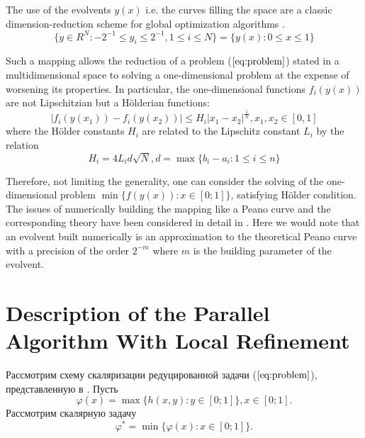 \documentclass{llncs}
\begin{document}
The use of the evolvents \(y(x)\) i.e. the curves filling the space are a classic dimension-reduction scheme for global optimization algorithms \cite{evolvents2013}.
\begin{displaymath}
\label{cube}
\lbrace y\in R^N:-2^{-1}\leqslant y_i\leqslant 2^{-1},1\leqslant i\leqslant N\rbrace=\{y(x):0\leqslant x\leqslant 1\}
\end{displaymath}
\par
Such a mapping allows the reduction of a problem (\(\ref{eq:problem}\)) stated in a multidimensional space to solving a one-dimensional problem at the expense of worsening its properties.
In particular, the one-dimensional functions \(f_i(y(x))\) are not Lipschitzian but a Hölderian functions:
\begin{equation}
\label{eq:holder}
|f_i(y(x_1))-f_i(y(x_2))|\leqslant H_i{|x_1-x_2|}^{\frac{1}{N}},x_1,x_2\in[0,1]
\end{equation}
where the Hölder constants \(H_i\) are related to the Lipschitz constant \(L_i\) by the relation
\begin{displaymath}
H_i=4L_id\sqrt{N},d=\max\{b_i-a_i:1\leqslant i\leqslant n\}
\end{displaymath}
\par
Therefore, not limiting the generality, one can consider the solving of the
one-dimensional problem \(\min\{f(y(x)): x\in [0;1]\}\), satisfying Hölder condition. The issues of numerically building the mapping like a Peano curve and the corresponding theory have been considered in detail in \cite{evolvents2013}. Here we would note that an evolvent built numerically is an approximation to the theoretical Peano curve with a precision of the order \(2^{-m}\) where \(m\) is the building parameter of the evolvent.

\section{Description of the Parallel Algorithm With Local Refinement}
\label{sec:algorithm}
Рассмотрим схему скаляризации редуцированной задачи (\(\ref{eq:problem}\)), представленную в \cite{markinStrongin1993}. Пусть
\begin{equation}
  \varphi(x)=\max\{h(x,y):y\in [0;1]\},x\in [0;1].
\end{equation}
Рассмотрим скалярную задачу
\begin{equation}
  \label{eq:aux_problem}
  \varphi^*=\min\{\varphi(x):x\in [0;1]\}.
\end{equation}
\end{document}
